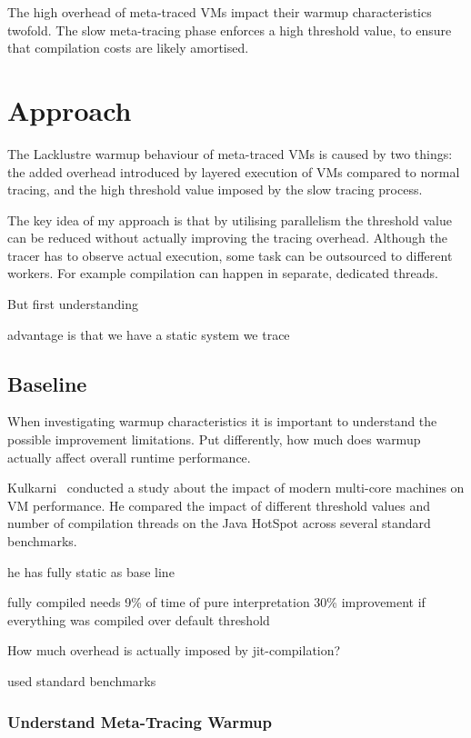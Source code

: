 The high overhead of meta-traced VMs impact their warmup characteristics
twofold. The slow meta-tracing phase enforces a high threshold value, to ensure
that compilation costs are likely amortised.

\section{Approach}

The Lacklustre warmup behaviour of meta-traced VMs is caused by two things: the
added overhead introduced by layered execution of VMs compared to normal
tracing, and the high threshold value imposed by the slow tracing process.

The key idea of my approach is that by utilising parallelism the threshold value
can be reduced without actually improving the tracing overhead. Although the
tracer has to observe actual execution, some task can be outsourced to different
workers. For example compilation can happen in separate, dedicated threads.

But first understanding 

advantage is that we have a static system we trace


\subsection{Baseline}

When investigating warmup characteristics it is important to understand the
possible improvement limitations. Put differently, how much does warmup actually
affect overall runtime performance.

Kulkarni~\cite{kulkarni2011jit} conducted a study about the impact of modern
multi-core machines on VM performance. He compared the impact of different
threshold values and number of compilation threads on the Java HotSpot across
several standard benchmarks. 

he has fully static as base line

fully compiled needs 9\% of time of pure interpretation
30\% improvement if everything was compiled over default threshold



How much overhead is actually imposed by jit-compilation?

used standard benchmarks




\subsubsection{Understand Meta-Tracing Warmup}

